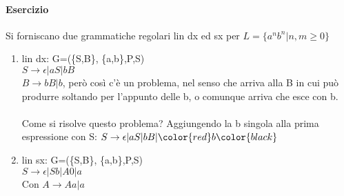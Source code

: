 \documentclass[12pt, a4paper, openany, oneside]{book}
\begin{document}
\paragraph{Esercizio} Si forniscano due grammatiche regolari lin dx ed sx per $L
= \{a^{n}b^{n}| n,m \geq 0\}$ \\
\begin{enumerate}
	\item lin dx: G=(\{S,B\}, \{a,b\},P,S)\\
	$S \to \epsilon | aS | bB$\\
	$B \to bB | b$, però così c'è un problema, nel senso che arriva alla B in cui
	può produrre soltando per l'appunto delle b, o comunque arriva che esce con b.
	\\  \\
	Come si risolve questo problema? Aggiungendo la b singola alla prima espressione 
	con S: $S \to \epsilon | aS | bB | \color{red} b \color{black}$
	\item lin sx: G=(\{S,B\}, \{a,b\},P,S)\\
	$S \to \epsilon | Sb | A0| a$ \\
	Con $A \to Aa | a$
\end{enumerate}
\end{document}
